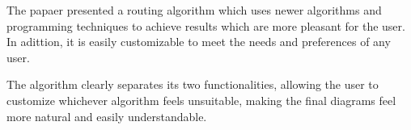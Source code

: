 The papaer presented a routing algorithm which uses newer algorithms and
programming techniques to achieve results which are more pleasant for the
user. In adittion, it is easily customizable to meet the needs and 
preferences of any user.

The algorithm clearly separates its two functionalities, allowing the 
user to customize whichever algorithm feels unsuitable, making the 
final diagrams feel more natural and easily understandable.
